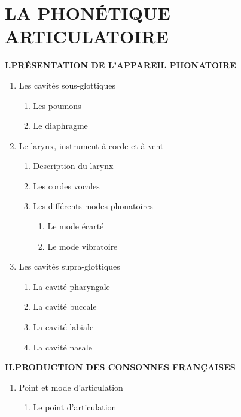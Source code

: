 \newfontfamily{}
\newcommand{\bipa}[1]{{\BBSevenIPA #1}}
\chapter{LA PHONÉTIQUE ARTICULATOIRE}
\label{chapter-7}
\begin{keybox}
\small
\textbf{I.\quad PRÉSENTATION DE L’APPAREIL PHONATOIRE}
\begin{enumerate}[label=\arabic*.]
\item Les cavités sous-glottiques
\begin{enumerate}[label=\textcircled{\scriptsize\arabic*}]
\item Les poumons
\item Le diaphragme
\end{enumerate}
\item Le larynx, instrument à corde et à vent
\begin{enumerate}[label=\textcircled{\scriptsize\arabic*}]
\item Description du larynx
\item Les cordes vocales
\item Les différents modes phonatoires
\begin{enumerate}[label=\arabic*.]
\item Le mode écarté
\item Le mode vibratoire
\end{enumerate}
\end{enumerate}
\item Les cavités supra-glottiques
\begin{enumerate}[label=\textcircled{\scriptsize\arabic*}]
\item La cavité pharyngale
\item La cavité buccale
\item La cavité labiale
\item La cavité nasale
\end{enumerate}
\end{enumerate}
\textbf{II.\quad PRODUCTION DES CONSONNES FRANÇAISES}
\begin{enumerate}[label=\arabic*.]
\item Point et mode d’articulation
\begin{enumerate}[label=\textcircled{\scriptsize\arabic*}]
\item Le point d’articulation

\end{enumerate}
\end{enumerate}
\end{keybox}
